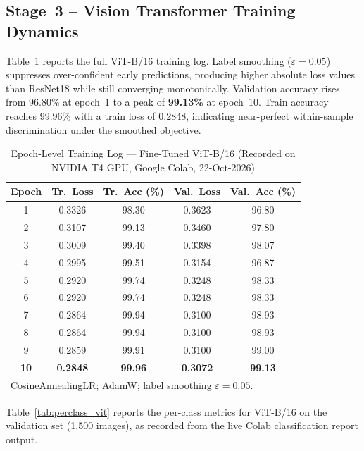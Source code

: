 \documentclass[journal]{IEEEtran}
\begin{document}
\subsection{Stage~3 -- Vision Transformer Training Dynamics}

Table~\ref{tab:vit_log} reports the full ViT-B/16 training log.
Label smoothing ($\varepsilon{=}0.05$) suppresses over-confident
early predictions, producing higher absolute loss values than
ResNet18 while still converging monotonically.
Validation accuracy rises from 96.80\% at epoch~1 to a
peak of \textbf{99.13\%} at epoch~10.
Train accuracy reaches 99.96\% with a train loss of 0.2848,
indicating near-perfect within-sample discrimination under the
smoothed objective.

\begin{table}[!t]
\renewcommand{\arraystretch}{1.2}
\caption{Epoch-Level Training Log --- Fine-Tuned ViT-B/16
  (Recorded on NVIDIA T4 GPU, Google Colab, 22-Oct-2026)}
\label{tab:vit_log}
\centering
\small
\begin{tabular}{ccccc}
\toprule
\textbf{Epoch} & \textbf{Tr.~Loss} & \textbf{Tr.~Acc (\%)} &
\textbf{Val.~Loss} & \textbf{Val.~Acc (\%)} \\
\midrule
1  & 0.3326 & 98.30 & 0.3623 & 96.80 \\
2  & 0.3107 & 99.13 & 0.3460 & 97.80 \\
3  & 0.3009 & 99.40 & 0.3398 & 98.07 \\
4  & 0.2995 & 99.51 & 0.3154 & 96.87 \\
5  & 0.2920 & 99.74 & 0.3248 & 98.33 \\
6  & 0.2920 & 99.74 & 0.3248 & 98.33 \\
7  & 0.2864 & 99.94 & 0.3100 & 98.93 \\
8  & 0.2864 & 99.94 & 0.3100 & 98.93 \\
9  & 0.2859 & 99.91 & 0.3100 & 99.00 \\
\textbf{10} & \textbf{0.2848} & \textbf{99.96} & \textbf{0.3072} & \textbf{99.13} \\
\bottomrule
\multicolumn{5}{l}{\footnotesize{CosineAnnealingLR; AdamW; label smoothing
  $\varepsilon{=}0.05$.}}
\end{tabular}
\end{table}

Table~\ref{tab:perclass_vit} reports the per-class metrics for
ViT-B/16 on the validation set (1,500 images), as recorded
from the live Colab classification report output.
\end{document}
